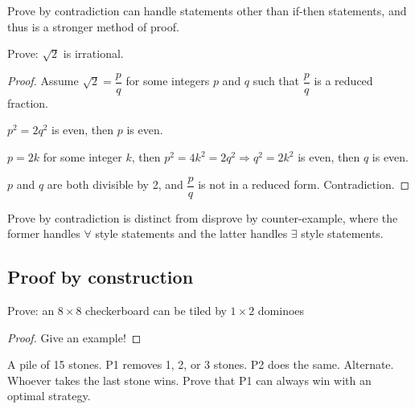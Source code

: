 \begin{remark}

Prove by contradiction can handle statements other than if-then statements, and thus is a stronger method of proof.

\end{remark}

\begin{ex}

Prove: $\sqrt{2}$ is irrational.

\end{ex}

\begin{proof}

Assume $\sqrt{2} = \dfrac{p}{q}$ for some integers $p$ and $q$ such that $\dfrac{p}{q}$ is a reduced fraction.

$p^2 = 2q^2$ is even, then $p$ is even.

$p = 2k$ for some integer $k$, then $p^2 = 4k^2 = 2q^2 \Rightarrow q^2 = 2k^2$ is even, then $q$ is even.

$p$ and $q$ are both divisible by 2, and $\dfrac{p}{q}$ is not in a reduced form. Contradiction.

\end{proof}

\begin{remark}

Prove by contradiction is distinct from disprove by counter-example, where the former handles $\forall$ style statements and the latter handles $\exists$ style statements.

\end{remark}

\subsection{Proof by construction}

\begin{ex}

Prove: an $8 \times 8$ checkerboard can be tiled by $1 \times 2$ dominoes

\end{ex}

\begin{proof}

Give an example!

\end{proof} 

\begin{ex}

A pile of 15 stones. P1 removes 1, 2, or 3 stones. P2 does the same. Alternate. Whoever takes the last stone wins. Prove that P1 can always win with an optimal strategy.

\end{ex}

